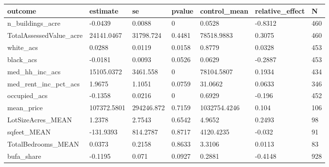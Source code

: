 \begin{table}[ht]
\centering
\begin{tabular}{lllllll}
  \hline
outcome & estimate & se & pvalue & control\_mean & relative\_effect & N \\ 
  \hline
n\_buildings\_acre & -0.0439 & 0.0088 & 0 & 0.0528 & -0.8312 & 460 \\ 
  TotalAssessedValue\_acre & 24141.0467 & 31798.724 & 0.4481 & 78518.9883 & 0.3075 & 460 \\ 
  white\_acs & 0.0288 & 0.0119 & 0.0158 & 0.8779 & 0.0328 & 453 \\ 
  black\_acs & -0.0181 & 0.0093 & 0.0526 & 0.0629 & -0.2887 & 453 \\ 
  med\_hh\_inc\_acs & 15105.0372 & 3461.558 & 0 & 78104.5807 & 0.1934 & 434 \\ 
  med\_rent\_inc\_pct\_acs & 1.9675 & 1.1051 & 0.0759 & 31.0662 & 0.0633 & 346 \\ 
  occupied\_acs & -0.1358 & 0.0216 & 0 & 0.6929 & -0.196 & 452 \\ 
  mean\_price & 107372.5801 & 294246.872 & 0.7159 & 1032754.4246 & 0.104 & 106 \\ 
  LotSizeAcres\_MEAN & 1.2378 & 2.7543 & 0.6542 & 4.9652 & 0.2493 & 98 \\ 
  sqfeet\_MEAN & -131.9393 & 814.2787 & 0.8717 & 4120.4235 & -0.032 & 91 \\ 
  TotalBedrooms\_MEAN & 0.0373 & 0.2158 & 0.8633 & 3.3106 & 0.0113 & 83 \\ 
  bufa\_share & -0.1195 & 0.071 & 0.0927 & 0.2881 & -0.4148 & 928 \\ 
   \hline
\end{tabular}
\end{table}
